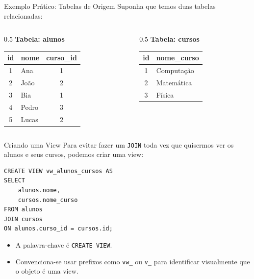 \documentclass[9pt]{beamer}
\begin{document}
\begin{frame}[fragile]{Exemplo Prático: Tabelas de Origem}
    Suponha que temos duas tabelas relacionadas:
    
    \begin{columns}
        \begin{column}{0.5\textwidth}
            \textbf{Tabela: alunos}
            \begin{center}
                \begin{tabular}{|c|l|c|}
                    \hline
                    \textbf{id} & \textbf{nome} & \textbf{curso\_id} \\
                    \hline
                    1 & Ana & 1 \\
                    2 & João & 2 \\
                    3 & Bia & 1 \\
                    4 & Pedro & 3 \\
                    5 & Lucas & 2 \\
                    \hline
                \end{tabular}
            \end{center}
        \end{column}
        
        \begin{column}{0.5\textwidth}
            \textbf{Tabela: cursos}
            \begin{center}
                \begin{tabular}{|c|l|}
                    \hline
                    \textbf{id} & \textbf{nome\_curso} \\
                    \hline
                    1 & Computação \\
                    2 & Matemática \\
                    3 & Física \\
                    \hline
                \end{tabular}
            \end{center}
        \end{column}
    \end{columns}
\end{frame}

\begin{frame}[fragile]{Criando uma View}
    Para evitar fazer um \texttt{JOIN} toda vez que quisermos ver os alunos e seus cursos, podemos criar uma view:
    
    \begin{lstlisting}
CREATE VIEW vw_alunos_cursos AS
SELECT
    alunos.nome,
    cursos.nome_curso
FROM alunos
JOIN cursos
ON alunos.curso_id = cursos.id;
    \end{lstlisting}
    
    \begin{itemize}
        \item A palavra-chave é \texttt{CREATE VIEW}.
        \item Convenciona-se usar prefixos como \texttt{vw\_} ou \texttt{v\_} para identificar visualmente que o objeto é uma view.
    \end{itemize}
\end{frame}
\end{document}
